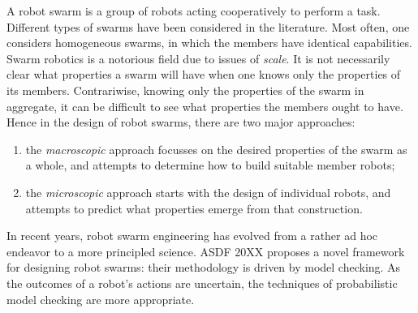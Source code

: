 \documentclass[11pt]{article}
\theoremstyle{definition}
\begin{document}
A robot swarm is a group of robots acting cooperatively to perform a task.
Different types of swarms have been considered in the literature.
Most often, one considers homogeneous swarms, in which the members have
identical capabilities.
Swarm robotics is a notorious field due to issues of \emph{scale}.
It is not necessarily clear what properties a swarm will have when one knows
only the properties of its members.
Contrariwise, knowing only the properties of the swarm in aggregate, it can be
difficult to see what properties the members ought to have.
Hence in the design of robot swarms, there are two major approaches:
%
\begin{enumerate}
    \item
        the \emph{macroscopic} approach focusses on the desired properties of
        the swarm as a whole, and attempts to determine how to build suitable
        member robots;
    \item
        the \emph{microscopic} approach starts with the design of individual
        robots, and attempts to predict what properties emerge from that
        construction.
\end{enumerate}

In recent years, robot swarm engineering has evolved from a rather ad hoc
endeavor to a more principled science.
ASDF 20XX proposes a novel framework for designing robot swarms: their
methodology is driven by model checking.
As the outcomes of a robot's actions are uncertain, the techniques of
probabilistic model checking are more appropriate.
%
%
%
\end{document}
